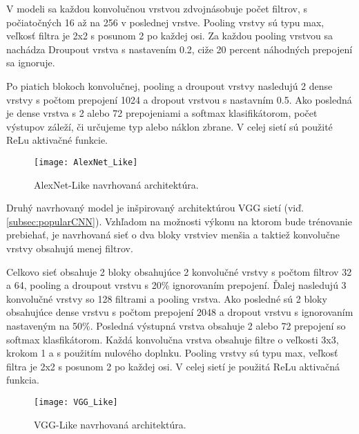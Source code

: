 V modeli sa každou konvolučnou vrstvou zdvojnásobuje počet filtrov, s počiatočných 16 až na 256 v poslednej vrstve.
Pooling vrstvy sú typu max, veľkosť filtra je 2x2 s posunom 2 po každej osi.
Za každou pooling vrstvou sa nachádza Droupout vrstva s nastavením 0.2, ciže 20 percent náhodných prepojení sa ignoruje.

Po piatich blokoch konvolučnej, pooling a droupout vrstvy nasledujú 2 dense vrstvy s počtom prepojení 1024 a dropout vrstvou s nastavním 0.5.
Ako posledná je dense vrstva s 2 alebo 72 prepojeniami a softmax klasifikátorom, počet výstupov záleží, či určujeme typ alebo náklon zbrane.
V celej sietí sú použité ReLu aktivačné funkcie.

\begin{figure}[H]
    \centering
    \texttt{[image: AlexNet\_Like]}
    \caption{AlexNet-Like navrhovaná architektúra.}
    \label{pic:kNN}
\end{figure}


Druhý navrhovaný model je inšpirovaný architektúrou VGG sietí (viď. \ref{subsec:popularCNN}).
Vzhľadom na možnosti výkonu na ktorom bude trénovanie prebiehať, je navrhovaná sieť o dva bloky vrstviev menšia a taktiež konvolučne vrstvy obsahujú menej filtrov.

Celkovo sieť obsahuje 2 bloky obsahujúce 2 konvolučné vrstvy s počtom filtrov 32 a 64, pooling a droupout vrstvu s 20\% ignorovaním prepojení.
Ďalej nasledujú 3 konvolučné vrstvy so 128 filtrami a pooling vrstva.
Ako posledné sú 2 bloky obsahujúce dense vrstvu s počtom prepojení 2048 a dropout vrstvu s ignorovaním nastaveným na 50\%.
Posledná výstupná vrstva obsahuje 2 alebo 72 prepojení so softmax klasfikátorom.
Každá konvolučna vrstva obsahuje filtre o veľkosti 3x3, krokom 1 a s použitím nulového doplnku.
Pooling vrstvy sú typu max, veľkosť filtra je 2x2 s posunom 2 po každej osi.
V celej sietí je použitá ReLu aktivačná funkcia.

\begin{figure}[H]
    \centering
    \texttt{[image: VGG\_Like]}
    \caption{VGG-Like navrhovaná architektúra.}
    \label{pic:kNN}
\end{figure}
